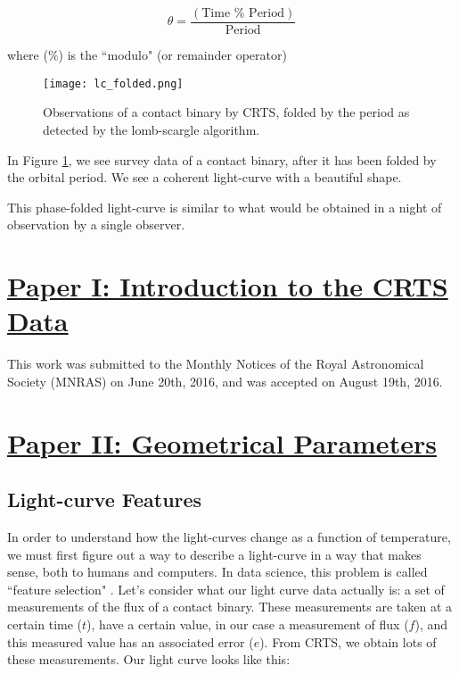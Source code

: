 \documentclass[12pt]{article} %
\numberwithin{equation}{section} %
\begin{document}
\begin{equation} \label{phase_fold}
\theta = \frac{(\text{Time } \% \text{ Period})}{\text{Period}}
\end{equation}

where (\%) is the ``modulo" (or remainder operator)

\begin{figure}[H]
\centering
\texttt{[image: lc\_folded.png]}
\caption{Observations of a contact binary by CRTS, folded by the period as detected by the lomb-scargle algorithm.}
\label{fig: lc_folded}
\end{figure}

In Figure \ref{fig: lc_folded}, we see survey data of a contact binary, after it has been folded by the orbital period. We see a coherent light-curve with a beautiful shape.

This phase-folded light-curve is similar to what would be obtained in a night of  observation by a single observer.

\section[Paper I: Introduction to the CRTS Data]{\hyperlink{toc}{Paper I: Introduction to the CRTS Data}} \label{sec: Paper I: Introduction to the CRTS Data}

This work was submitted to the Monthly Notices of the Royal Astronomical Society (MNRAS) on June 20th, 2016, and was accepted on August 19th, 2016.



\section[Paper II: Geometrical Parameters]{\hyperlink{toc}{Paper II: Geometrical Parameters}} \label{sec: Paper II: Geometrical Parameters}

\subsection[Light-curve Features]{Light-curve Features} \label{sec: Light-curve Features}

In order to understand how the light-curves change as a function of temperature, we must first figure out a way to describe a light-curve in a way that makes sense, both to humans and computers. In data science, this problem is called ``feature selection" . Let's consider what our light curve data actually is: a set of measurements of the flux of a contact binary. These measurements are taken at a certain time ($t$), have a certain value, in our case a measurement of flux ($f$), and this measured value has an associated error ($e$). From CRTS, we obtain lots of these measurements. Our light curve looks like this:
\end{document}
